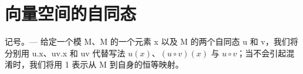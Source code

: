\section{向量空间的自同态}

记号。--- 给定一个模 M、M 的一个元素 x 以及 M 的两个自同态 u 和 v，我们将分别用 u.x、uv.x 和 uv 代替写法 \(u(x)\)、\((u \circ v)(x)\) 与 \(u \circ v\)；当不会引起混淆时，我们将用 1 表示从 M 到自身的恒等映射。

